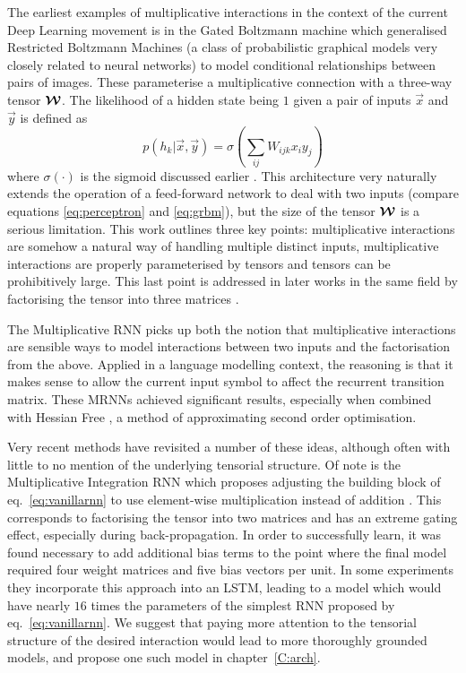 The earliest examples of multiplicative interactions in the context of the current Deep Learning
movement is in the Gated Boltzmann machine \autocite{Memisevic2007} which generalised Restricted
Boltzmann Machines \autocite{Smolensky1986} (a class of probabilistic graphical models very closely
related to neural networks) to model conditional relationships between pairs of images. These 
parameterise a multiplicative connection with a three-way tensor \(\bm{\mathcal{W}}\).
The likelihood of a hidden state
being \(1\) given a pair of inputs \(\vec{x}\) and \(\vec{y}\) is defined as
\begin{equation}\label{eq:grbm}
	p(h_k | \vec{x},\vec{y}) = \sigma\left(\sum_{ij} W_{ijk}x_iy_j \right)
\end{equation} where \(\sigma(\cdot)\) is the sigmoid discussed earlier \autocite{Memisevic2007}.
This architecture very naturally extends the operation of a feed-forward network to deal with
two inputs (compare equations \eqref{eq:perceptron} and \eqref{eq:grbm}), but the size of the
tensor \(\bm{\mathcal{W}}\) is a serious limitation. This work outlines three key points: 
multiplicative interactions are somehow a natural way of handling multiple distinct inputs,
multiplicative interactions are properly parameterised by tensors
and tensors can be prohibitively large.
This last point is addressed in later works in the same field by factorising the tensor into three
matrices \autocite{Taylor, Memisevic2010}.

The Multiplicative RNN \autocite{Martens2011a, Sutskever2013} picks up both the notion that
multiplicative interactions are sensible ways to model interactions between two inputs and the
factorisation from the above. Applied in a language modelling context, the reasoning is that it
makes sense to allow the current input symbol to affect the recurrent transition matrix. These MRNNs
achieved significant results, especially when combined with Hessian Free \autocite{Martens2011},
a method of approximating second order optimisation.

Very recent methods have revisited a number of these ideas, although often with little to no mention
of the underlying tensorial structure. Of note is the Multiplicative Integration RNN which proposes
adjusting the building block of eq.~\eqref{eq:vanillarnn} to use element-wise multiplication instead
of addition \autocite{Wu2016}.
 This corresponds to factorising the tensor into two matrices and has an extreme gating
effect, especially during back-propagation.
In order to successfully learn, it was found necessary to add additional bias terms to the
point where the final model required four weight matrices and five bias vectors per unit. In some
experiments they incorporate this approach into an LSTM, leading to a model which would have nearly
\(16\) times the parameters of the simplest RNN proposed by eq.~\eqref{eq:vanillarnn}. We suggest
that paying more attention to the tensorial structure of the desired interaction would lead to more
thoroughly grounded models, and propose one such model in chapter~\ref{C:arch}.

